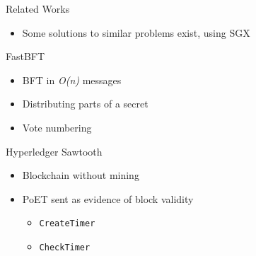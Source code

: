 \documentclass{beamer}
\begin{document}
	\begin{frame}{Related Works} %
		\begin{itemize}
			\item Some solutions to similar problems exist, using SGX
		\end{itemize}
	\end{frame}

	\begin{frame}{FastBFT} %
		\begin{itemize}
			\item BFT in \textit{O(n)} messages
			\item Distributing parts of a secret
			\item Vote numbering
		\end{itemize}
	\end{frame}

	\begin{frame}{Hyperledger Sawtooth}	%
		\begin{itemize}
			\item Blockchain without mining
			\item PoET sent as evidence of block validity
			\begin{itemize}
				\item \texttt{CreateTimer}
				\item \texttt{CheckTimer}
			\end{itemize}
		\end{itemize}
	\end{frame}
\end{document}
